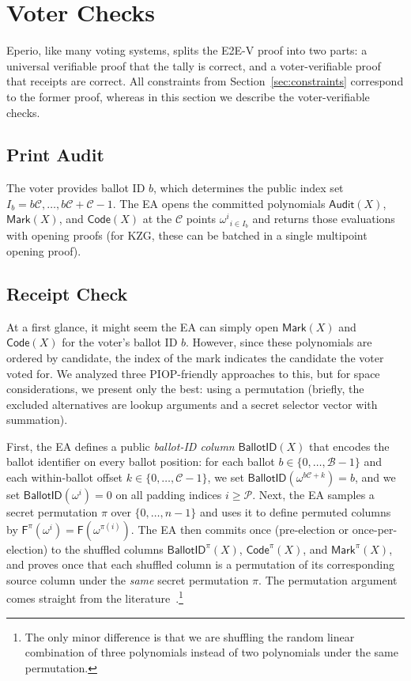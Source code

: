 
\section{Voter Checks}
\label{sec:voter}
Eperio, like many voting systems, splits the E2E-V proof into two parts: a universal verifiable proof that the tally is correct, and a voter-verifiable proof that receipts are correct. All constraints from Section~\ref{sec:constraints} correspond to the former proof, whereas in this section we describe the voter-verifiable checks.

\subsection{Print Audit}
\label{sec:print}

The voter provides ballot ID $b$, which determines the public index set $I_b={b\mathcal{C},\ldots,b\mathcal{C}+\mathcal{C}-1}$. The EA opens the committed polynomials $\mathsf{Audit}(X)$, $\mathsf{Mark}(X)$, and $\mathsf{Code}(X)$ at the $\mathcal{C}$ points ${\omega^i}_{i\in I_b}$ and returns those evaluations with opening proofs (for KZG, these can be batched in a single multipoint opening proof). 

\subsection{Receipt Check}
\label{sec:receipt}

At a first glance, it might seem the EA can simply open $\mathsf{Mark}(X)$ and $\mathsf{Code}(X)$ for the voter's ballot ID $b$. However, since these polynomials are ordered by candidate, the index of the mark indicates the candidate the voter voted for. We analyzed three PIOP-friendly approaches to this, but for space considerations, we present only the best: using a permutation (briefly, the excluded alternatives are lookup arguments and a secret selector vector with summation). 

First, the EA defines a public \emph{ballot-ID column} $\mathsf{BallotID}(X)$ that encodes the ballot identifier on every ballot position: for each ballot $b\in\{0,\dots,\mathcal{B}-1\}$ and each within-ballot offset $k\in\{0,\dots,\mathcal{C}-1\}$, we set $\mathsf{BallotID}(\omega^{b\mathcal{C}+k})=b$, and we set $\mathsf{BallotID}(\omega^i)=0$ on all padding indices $i\ge \mathcal{P}$. Next, the EA samples a secret permutation $\pi$ over $\{0,\dots,n-1\}$ and uses it to define permuted columns by $\mathsf{F}^{\pi}(\omega^i)=\mathsf{F}(\omega^{\pi(i)})$. The EA then commits once (pre-election or once-per-election) to the shuffled columns $\mathsf{BallotID}^{\pi}(X)$, $\mathsf{Code}^{\pi}(X)$, and $\mathsf{Mark}^{\pi}(X)$, and proves once that each shuffled column is a permutation of its corresponding source column under the \emph{same} secret permutation $\pi$. The permutation argument comes straight from the literature~\cite{GWC19}.\footnote{The only minor difference is that we are shuffling the random linear combination of three polynomials instead of two polynomials under the same permutation.}

